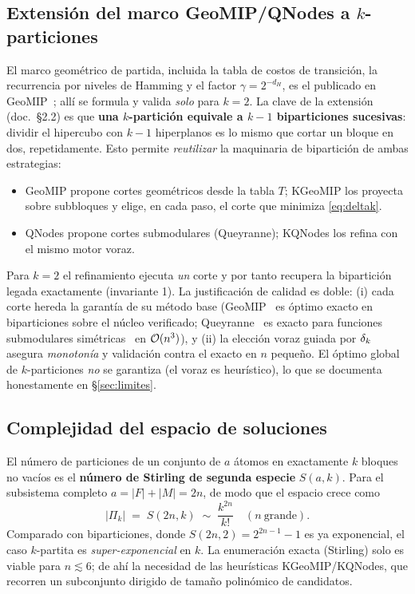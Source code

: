 \documentclass[11pt,letterpaper]{article}
\begin{document}
\subsection{Extensión del marco GeoMIP/QNodes a $k$-particiones}
El marco geométrico de partida, incluida la tabla de costos de transición, la
recurrencia por niveles de Hamming y el factor $\gamma=2^{-d_H}$, es el publicado en
GeoMIP~\cite{geomip}; allí se formula y valida \emph{solo} para $k=2$. La clave de
la extensión (doc.\ §2.2) es que \textbf{una $k$-partición equivale a
	$k-1$ biparticiones sucesivas}: dividir el hipercubo con $k-1$ hiperplanos es lo
mismo que cortar un bloque en dos, repetidamente. Esto permite \emph{reutilizar}
la maquinaria de bipartición de ambas estrategias:
\begin{itemize}
	\item GeoMIP propone cortes geométricos desde la tabla $T$; KGeoMIP los
	      proyecta sobre subbloques y elige, en cada paso, el corte que minimiza
	      \eqref{eq:deltak}.
	\item QNodes propone cortes submodulares (Queyranne); KQNodes los refina con el
	      mismo motor voraz.
\end{itemize}
Para $k=2$ el refinamiento ejecuta \emph{un} corte y por tanto recupera la
bipartición legada exactamente (invariante 1). La justificación de calidad es
doble: (i) cada corte hereda la garantía de su método base (GeoMIP~\cite{geomip} es óptimo
exacto en biparticiones sobre el núcleo verificado; Queyranne~\cite{queyranne} es
exacto para funciones submodulares simétricas~\cite{nwf} en $\mathcal{O}(n^3)$), y (ii) la
elección voraz
guiada por $\delta_k$ asegura \emph{monotonía} y validación contra el exacto en $n$
pequeño. El óptimo global de $k$-particiones \emph{no} se garantiza (el voraz es
heurístico), lo que se documenta honestamente en §\ref{sec:limites}.

\subsection{Complejidad del espacio de soluciones}
El número de particiones de un conjunto de $a$ átomos en exactamente $k$ bloques
no vacíos es el \textbf{número de Stirling de segunda especie} $S(a,k)$. Para el
subsistema completo $a = |F|+|M| = 2n$, de modo que el espacio crece como
\[
	|\Pi_k| \;=\; S(2n,k) \;\sim\; \frac{k^{2n}}{k!}\quad (n\ \text{grande}).
\]
Comparado con biparticiones, donde $S(2n,2)=2^{2n-1}-1$ es ya exponencial, el
caso $k$-partita es \emph{super-exponencial} en $k$. La enumeración exacta
(Stirling) solo es viable para $n\lesssim 6$; de ahí la necesidad de las
heurísticas KGeoMIP/KQNodes, que recorren un subconjunto dirigido de tamaño
polinómico de candidatos.
\end{document}
